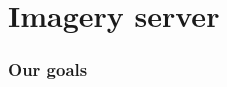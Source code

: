 \documentclass[17pt]{beamer}
\begin{document}




















\section{Imagery server}

\begin{frame}
  \frametitle{Our goals}

\end{frame}
\end{document}
